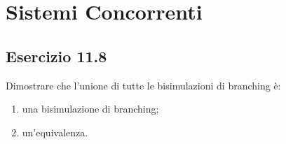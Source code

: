 \chapter{Sistemi Concorrenti}
\label{chap:parte3}

\section*{Esercizio 11.8}
{}
\label{es:11.8}

\begin{tcolorbox} \cite{mssc2016}
Dimostrare che l'unione di tutte le bisimulazioni di branching è: 
\begin{enumerate}
\item una bisimulazione di branching;
\item un'equivalenza.
\end{enumerate}
\end{tcolorbox}

